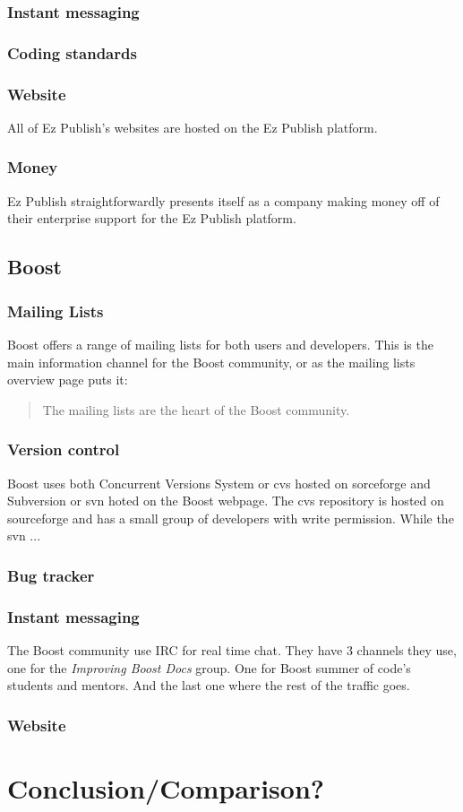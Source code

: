\documentclass{report} %
\begin{document}
\subsubsection{Instant messaging} %
\subsubsection{Coding standards}
\subsubsection{Website}
All of Ez Publish's websites are hosted on the Ez Publish platform.
\subsubsection{Money}
Ez Publish straightforwardly presents itself as a company making money off of their enterprise support for the Ez Publish platform.

\subsection{Boost}
\subsubsection{Mailing Lists}
Boost offers a range of mailing lists\cite{boostmaillists} for both users and developers. This is the main information channel for the Boost community, or as the mailing lists overview page\cite{boostmaillists} puts it:
\begin{quote}
The mailing lists are the heart of the Boost community.
\end{quote}
\subsubsection{Version control}
Boost uses both Concurrent Versions System or cvs hosted on sorceforge\cite{boostcvssourceforge} and Subversion or svn hoted on the Boost webpage\cite{boostsvn}. The cvs repository is hosted on sourceforge and has a small group of developers with write permission. While the svn ...

\subsubsection{Bug tracker}

\subsubsection{Instant messaging}
The Boost community use IRC for real time chat. They have 3 channels they use, one for the \emph{Improving Boost Docs} group. One for Boost summer of code's students and mentors. And the last one where the rest of the traffic goes.
\subsubsection{Website}

\section{Conclusion/Comparison?}


\end{document}
